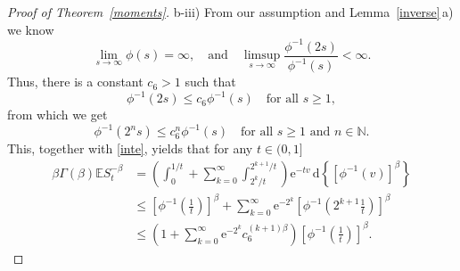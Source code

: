 \documentclass{aptpub}
\newcommand\EE{\mathds E}
\newcommand\NN{\mathds N}
\newcommand\dup{\mathrm{d}}
\newcommand\eup{\mathrm{e}}                                %
\numberwithin{equation}{section}
\begin{document}
\begin{proof}[Proof of Theorem~\ref{moments}]
\medskip\noindent b-iii)
From our assumption and Lemma~\ref{inverse}\,a) we know
$$
    \lim_{s\to\infty}\phi(s)=\infty,
    \quad\text{and}\quad
    \limsup_{s\to\infty} \frac{\phi^{-1}(2s)}{\phi^{-1}(s)}<\infty.
$$
Thus, there is a constant $c_6>1$ such that
$$
    \phi^{-1}(2s)
    \leq c_6 \phi^{-1}(s)
    \quad\text{for all $s\geq1$},
$$
from which we get
$$
    \phi^{-1}(2^ns)
    \leq c_6^n \phi^{-1}(s)
    \quad \text{for all $s\geq1$ and $n\in\NN$}.
$$
This, together with \eqref{inte}, yields that for any $t\in(0,1]$
\begin{align*}
    \beta\Gamma(\beta)\EE S_t^{-\beta}
    &= \left( \int_0^{1/t} + \sum_{k=0}^\infty \int_{2^k/t}^{2^{k+1}/t} \right)
        \eup^{-tv}\,\dup\left\{\left[\phi^{-1}(v)\right]^\beta\right\}\\
    &\leq\left[\phi^{-1}\left(\tfrac{1}{t}\right)\right]^\beta + \sum_{k=0}^\infty\eup^{-2^k} \left[\phi^{-1}\left(2^{k+1}\tfrac{1}{t}\right)\right]^\beta\\
    &\leq\left(1+\sum_{k=0}^\infty\eup^{-2^k}c_6^{(k+1)\beta
    }\right)\left[\phi^{-1}\left(\tfrac{1}{t}\right)\right]^\beta.
\end{align*}



\end{proof}
\end{document}
